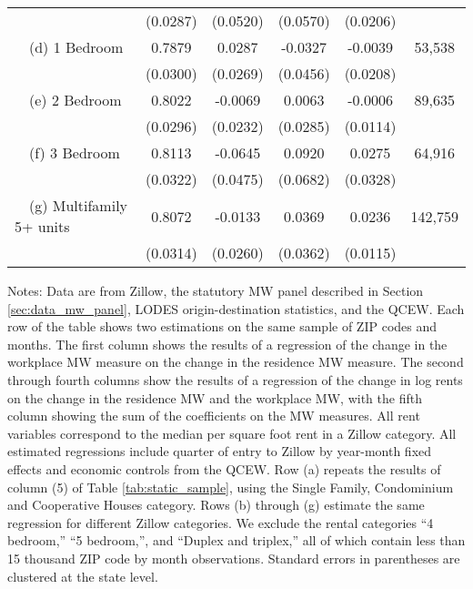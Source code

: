 \begin{landscape}
\begin{table}[ht!]
\begin{tabular}{@{}lccccc@{}}
                                                 & (0.0287) & (0.0520) & (0.0570) & (0.0206) &      \\
        $\quad$(d) 1 Bedroom                     &  0.7879  &  0.0287  &  -0.0327  &  -0.0039  & 53,538 \\
                                                 & (0.0300) & (0.0269) & (0.0456) & (0.0208) &      \\
        $\quad$(e) 2 Bedroom                     &  0.8022  &  -0.0069  &  0.0063  &  -0.0006  & 89,635 \\
                                                 & (0.0296) & (0.0232) & (0.0285) & (0.0114) &      \\
        $\quad$(f) 3 Bedroom                     &  0.8113  &  -0.0645  &  0.0920  &  0.0275  & 64,916 \\
                                                 & (0.0322) & (0.0475) & (0.0682) & (0.0328) &      \\
        $\quad$(g) Multifamily 5+ units          &  0.8072  &  -0.0133  &  0.0369  &  0.0236  & 142,759 \\
                                                 & (0.0314) & (0.0260) & (0.0362) & (0.0115) &      \\ \bottomrule
    \end{tabular}

    \begin{minipage}{.95\linewidth} \footnotesize
        \vspace{2mm}
        Notes:
        Data are from Zillow, the statutory MW panel described in
        Section \ref{sec:data_mw_panel}, LODES origin-destination statistics,
        and the QCEW.
        Each row of the table shows two estimations on the same sample of ZIP 
        codes and months.
        The first column shows the results of a regression of the change in the 
        workplace MW measure on the change in the residence MW measure.
        The second through fourth columns show the results of a regression of 
        the change in log rents on the change in the residence MW and the 
        workplace MW, with the fifth column showing the sum of the coefficients 
        on the MW measures.
        All rent variables correspond to the median per square foot rent in a 
        Zillow category.
        All estimated regressions include quarter of entry to Zillow by year-month 
        fixed effects and economic controls from the QCEW.
        Row (a) repeats the results of column (5) of Table \ref{tab:static_sample}, 
        using the Single Family, Condominium and Cooperative Houses category.
        Rows (b) through (g) estimate the same regression for different Zillow 
        categories.
        We exclude the rental categories ``4 bedroom,'' ``5 bedroom,'', and
        ``Duplex and triplex,'' all of which contain less than 15 thousand
        ZIP code by month observations.
        Standard errors in parentheses are clustered at the state level.
    \end{minipage}
\end{table}
\end{landscape}
